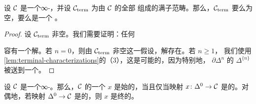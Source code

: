 \begin{proposition}\label{prop:terminal-contractible}
设 $\mathcal{C}$ 是一个∞-\trCategory{}，并设 $\mathcal{C}_{\mathrm{term}}$ 为由 $\mathcal{C}$ 的全部%
\trTerminalObject{}组成的满子范畴。那么，$\mathcal{C}_{\mathrm{term}}$ 要么为空，要么是一个%
\trContractible{}\trKanComplex{}。
\end{proposition}

\begin{proof}
设 $\mathcal{C}_{\mathrm{term}}$ 非空。我们需要证明：任何\trLiftingProblem{}%
\begin{center}
\end{center}
容有一个解。若 $n = 0$，则由 $\mathcal{C}_{\mathrm{term}}$ 非空这一假设，解存在。若 $n \ge 1$，
我们使用\cref{lem:terminal-characterizations}的（3），这是可能的，因为特别地，
$\partial\Delta^n$ 的\trObject{} $\Delta^{\{n\}}$ 被送到一个\trTerminalObject{}。
\end{proof}

\begin{lemma}\label{lem:initial-left-anodyne}
设 $\mathcal{C}$ 是一个∞-\trCategory{}。那么，$\mathcal{C}$ 的一个\trObject{} $x$ 是始的，当且仅当映射
$x\colon \Delta^0 \to \mathcal{C}$ 是\trLeftAnodyne{}的。对偶地，若映射 $\Delta^0 \to \mathcal{C}$
是\trRightAnodyne{}的，则 $x$ 是终的。
\end{lemma}

